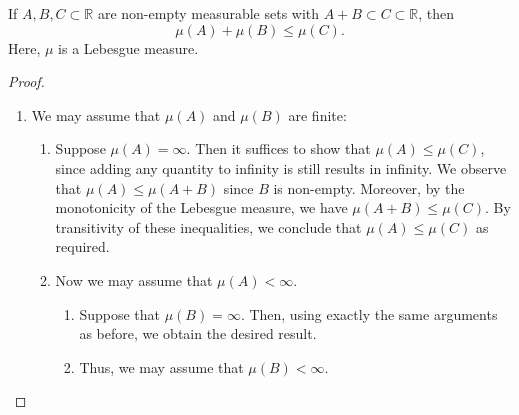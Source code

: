 \begin{theorem}
    If \(A, B, C \subset \mathbb{R}\) are non-empty measurable sets with \(A+B\subset C \subset \mathbb{R}\), then
    \begin{equation*}
        \mu(A) + \mu(B) \leq \mu(C).
    \end{equation*}
    Here, \(\mu\) is a Lebesgue measure.
\end{theorem}

\begin{proof}
    \begin{enumerate}
        \item We may assume that \(\mu(A)\) and \(\mu(B)\) are finite:

        \begin{enumerate}
            \item Suppose \(\mu(A) = \infty\). Then it suffices to show that \(\mu(A) \leq \mu(C)\),
            since adding any quantity to infinity is still results in infinity. 
            We observe that \(\mu(A) \leq \mu(A+B)\) since \(B\) is non-empty.
            Moreover, by the monotonicity of the Lebesgue measure, we have \(\mu (A+B) \leq \mu(C)\).
            By transitivity of these inequalities, we conclude that \(\mu(A) \leq \mu(C)\) as required.

            \item Now we may assume that \(\mu(A) < \infty\).
            \begin{enumerate}
                \item Suppose that \(\mu(B) = \infty\). 
                Then, using exactly the same arguments as before, we obtain the desired result. 
                \item Thus, we may assume that \(\mu(B) < \infty\).
            \end{enumerate}
        \end{enumerate}


\end{enumerate}
\end{proof}

